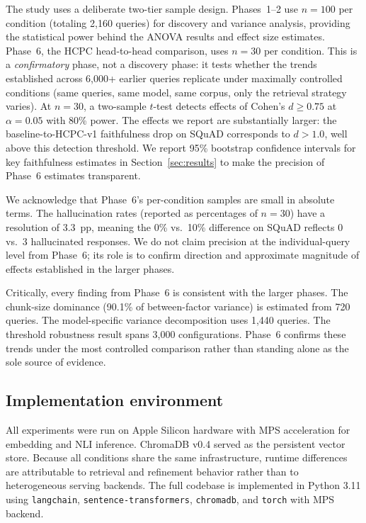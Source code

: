 The study uses a deliberate two-tier sample design. Phases~1--2 use
$n = 100$ per condition (totaling 2,160 queries) for discovery and variance
analysis, providing the statistical power behind the ANOVA results and effect
size estimates. Phase~6, the HCPC head-to-head comparison, uses $n = 30$ per
condition. This is a \emph{confirmatory} phase, not a discovery phase: it
tests whether the trends established across 6,000+ earlier queries replicate
under maximally controlled conditions (same queries, same model, same
corpus, only the retrieval strategy varies). At $n = 30$, a two-sample
$t$-test detects effects of Cohen's $d \geq 0.75$ at $\alpha = 0.05$ with
80\% power. The effects we report are substantially larger: the
baseline-to-HCPC-v1 faithfulness drop on SQuAD corresponds to $d > 1.0$,
well above this detection threshold. We report 95\% bootstrap confidence
intervals for key faithfulness estimates in Section~\ref{sec:results} to
make the precision of Phase~6 estimates transparent.

We acknowledge that Phase~6's per-condition samples are small in absolute
terms. The hallucination rates (reported as percentages of $n = 30$) have a
resolution of 3.3~pp, meaning the 0\% vs.\ 10\% difference on SQuAD
reflects 0 vs.\ 3 hallucinated responses. We do not claim precision at the
individual-query level from Phase~6; its role is to confirm direction and
approximate magnitude of effects established in the larger phases.

Critically, every finding from Phase~6 is consistent with the larger
phases. The chunk-size dominance (90.1\% of between-factor variance) is
estimated from 720 queries. The model-specific variance decomposition uses
1,440 queries. The threshold robustness result spans 3,000 configurations.
Phase~6 confirms these trends under the most controlled comparison rather
than standing alone as the sole source of evidence.

\subsection{Implementation environment}

All experiments were run on Apple Silicon hardware with MPS acceleration for
embedding and NLI inference. ChromaDB v0.4 served as the persistent vector
store. Because all conditions share the same infrastructure, runtime
differences are attributable to retrieval and refinement behavior rather
than to heterogeneous serving backends. The full codebase is implemented
in Python 3.11 using \texttt{langchain}, \texttt{sentence-transformers},
\texttt{chromadb}, and \texttt{torch} with MPS backend.

\FloatBarrier
